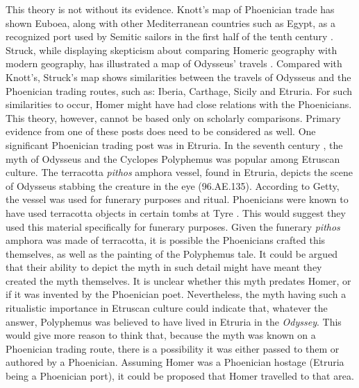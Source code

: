 This theory is not without its evidence. Knott’s map of Phoenician trade has shown Euboea, along with other Mediterranean countries such as Egypt, as a recognized port used by Semitic sailors in the first half of the tenth century \BC \parencite{Knott2014}. Struck, while displaying skepticism about comparing Homeric geography with modern geography, has illustrated a map of Odysseus’ travels \parencite{Struck2009}. Compared with Knott’s, Struck’s map shows similarities between the travels of Odysseus and the Phoenician trading routes, such as: Iberia, Carthage, Sicily and Etruria. For such similarities to occur, Homer might have had close relations with the Phoenicians.  This theory, however, cannot be based only on scholarly comparisons. Primary evidence from one of these posts does need to be considered as well. One significant Phoenician trading post was in Etruria. In the seventh century \BC, the myth of Odysseus and the Cyclopes Polyphemus was popular among Etruscan culture. The terracotta \emph{pithos} amphora vessel, found in Etruria, depicts the scene of Odysseus stabbing the creature in the eye (96.AE.135). According to Getty, the vessel was used for funerary purposes and ritual. Phoenicians were known to have used terracotta objects in certain tombs at Tyre \parencite[152]{Aubet2010}. This would suggest they used this material specifically for funerary purposes. Given the funerary \emph{pithos} amphora was made of terracotta, it is possible the Phoenicians crafted this themselves, as well as the painting of the Polyphemus tale. It could be argued that their ability to depict the myth in such detail might have meant they created the myth themselves. It is unclear whether this myth predates Homer, or if it was invented by the Phoenician poet. Nevertheless, the myth having such a ritualistic importance in Etruscan culture could indicate that, whatever the answer, Polyphemus was believed to have lived in Etruria in the \emph{Odyssey}. This would give more reason to think that, because the myth was known on a Phoenician trading route, there is a possibility it was either passed to them or authored by a Phoenician. Assuming Homer was a Phoenician hostage (Etruria being a Phoenician port), it could be proposed that Homer travelled to that area.
	
